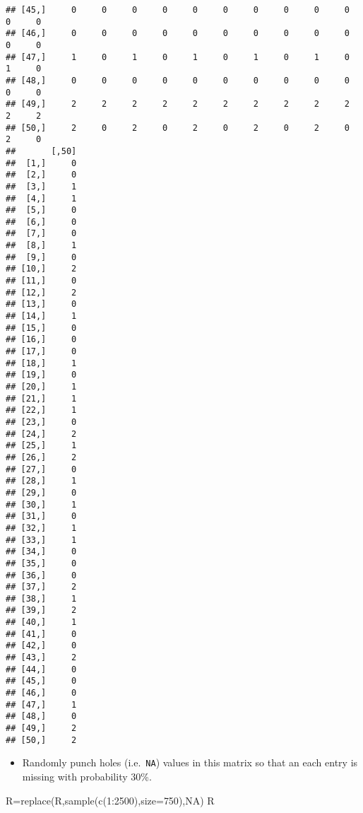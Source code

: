 \documentclass[
]{article}
\newenvironment{Shaded}{\begin{snugshade}}{\end{snugshade}}
\newcommand{\AttributeTok}[1]{\textcolor[rgb]{0.77,0.63,0.00}{#1}}
\newcommand{\ConstantTok}[1]{\textcolor[rgb]{0.00,0.00,0.00}{#1}}
\newcommand{\DecValTok}[1]{\textcolor[rgb]{0.00,0.00,0.81}{#1}}
\newcommand{\FunctionTok}[1]{\textcolor[rgb]{0.00,0.00,0.00}{#1}}
\newcommand{\NormalTok}[1]{#1}
\newcommand{\OtherTok}[1]{\textcolor[rgb]{0.56,0.35,0.01}{#1}}
\newcommand{\SpecialCharTok}[1]{\textcolor[rgb]{0.00,0.00,0.00}{#1}}
\providecommand{\tightlist}{%
  \setlength{\itemsep}{0pt}\setlength{\parskip}{0pt}}
\begin{document}
\begin{verbatim}
## [45,]     0     0     0     0     0     0     0     0     0     0     0     0
## [46,]     0     0     0     0     0     0     0     0     0     0     0     0
## [47,]     1     0     1     0     1     0     1     0     1     0     1     0
## [48,]     0     0     0     0     0     0     0     0     0     0     0     0
## [49,]     2     2     2     2     2     2     2     2     2     2     2     2
## [50,]     2     0     2     0     2     0     2     0     2     0     2     0
##       [,50]
##  [1,]     0
##  [2,]     0
##  [3,]     1
##  [4,]     1
##  [5,]     0
##  [6,]     0
##  [7,]     0
##  [8,]     1
##  [9,]     0
## [10,]     2
## [11,]     0
## [12,]     2
## [13,]     0
## [14,]     1
## [15,]     0
## [16,]     0
## [17,]     0
## [18,]     1
## [19,]     0
## [20,]     1
## [21,]     1
## [22,]     1
## [23,]     0
## [24,]     2
## [25,]     1
## [26,]     2
## [27,]     0
## [28,]     1
## [29,]     0
## [30,]     1
## [31,]     0
## [32,]     1
## [33,]     1
## [34,]     0
## [35,]     0
## [36,]     0
## [37,]     2
## [38,]     1
## [39,]     2
## [40,]     1
## [41,]     0
## [42,]     0
## [43,]     2
## [44,]     0
## [45,]     0
## [46,]     0
## [47,]     1
## [48,]     0
## [49,]     2
## [50,]     2
\end{verbatim}

\begin{itemize}
\tightlist
\item
  Randomly punch holes (i.e.~\texttt{NA}) values in this matrix so that
  an each entry is missing with probability 30\%.
\end{itemize}

\begin{Shaded}
\begin{Highlighting}[]
\NormalTok{R}\OtherTok{=}\FunctionTok{replace}\NormalTok{(R,}\FunctionTok{sample}\NormalTok{(}\FunctionTok{c}\NormalTok{(}\DecValTok{1}\SpecialCharTok{:}\DecValTok{2500}\NormalTok{),}\AttributeTok{size=}\DecValTok{750}\NormalTok{),}\ConstantTok{NA}\NormalTok{)}
\NormalTok{R}
\end{Highlighting}
\end{Shaded}
\end{document}
